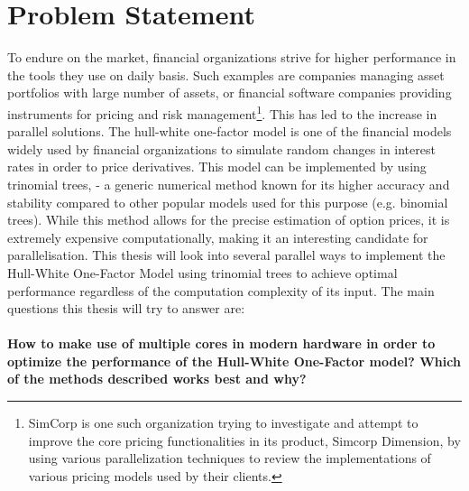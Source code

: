 \section{Problem Statement}
\label{section:problemstatement}
To endure on the market, financial organizations strive for higher performance in the tools they use on daily basis. Such examples are companies managing asset portfolios with large number of assets, or financial software companies providing instruments for pricing and risk management\footnote{SimCorp is one such organization trying to investigate and attempt to improve the core pricing functionalities in its product, Simcorp Dimension, by using various parallelization techniques to review the implementations of various pricing models used by their clients.}. This has led to the increase in parallel solutions. The hull-white one-factor model is one of the financial models widely used by financial organizations to simulate random changes in interest rates in order to price derivatives. This model can be implemented by using trinomial trees\cite[pg. 444]{ofod}, \cite{uhwirt} - a generic numerical method known for its higher accuracy and stability compared to other popular models used for this purpose (e.g. binomial trees). While this method allows for the precise estimation of option prices, it is extremely expensive computationally, making it an interesting candidate for parallelisation. This thesis will look into several parallel ways to implement the Hull-White One-Factor Model using trinomial trees to achieve optimal performance regardless of the computation complexity of its input. The main questions this thesis will try to answer are:\\\\
\textbf{How to make use of multiple cores in modern hardware in order to optimize the performance of the Hull-White One-Factor model? Which of the methods described works best and why?}



